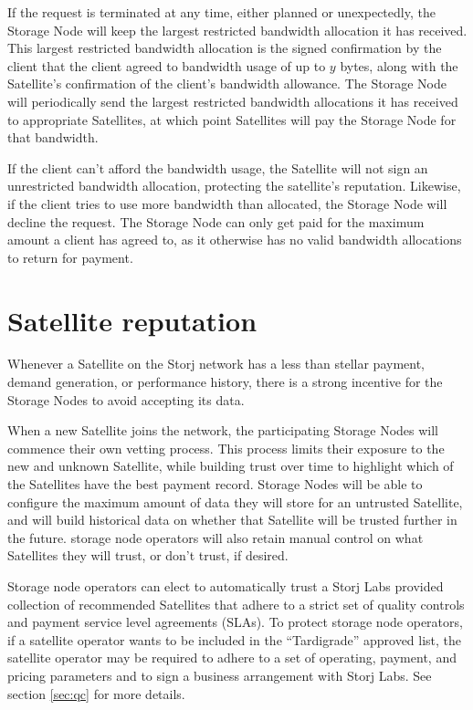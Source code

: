\documentclass[8pt,fleqn,openany]{book}
\begin{document}
If the request is terminated at any time,
either planned or unexpectedly,
the Storage Node will keep the largest restricted bandwidth allocation it has
received.
This largest restricted bandwidth allocation is the signed confirmation
by the client that the client agreed to bandwidth usage of up to $y$
bytes, along with the Satellite's confirmation of the client's bandwidth
allowance.
The Storage Node will periodically send the largest restricted bandwidth
allocations it has received to appropriate Satellites, at which point
Satellites will pay the Storage Node for that bandwidth.

If the client can't afford the bandwidth usage, the Satellite will not sign an
unrestricted bandwidth allocation, protecting the satellite's reputation.
Likewise, if the client tries to use more bandwidth than allocated,
the Storage Node will decline the request.
The Storage Node can only get paid for the maximum amount a client has agreed
to,
as it otherwise has no valid bandwidth allocations to return for
payment.

\section{Satellite reputation}

Whenever a Satellite on the Storj network has a less than stellar payment,
demand generation, or performance history,
there is a strong incentive for the Storage Nodes to avoid accepting its data.

When a new Satellite joins the network, the participating Storage Nodes will
commence their own vetting process.
This process limits their exposure to the new and unknown
Satellite, while building trust over time to highlight which of the
Satellites have the best payment record.
Storage Nodes will be able to configure the maximum amount of data they will
store for an untrusted Satellite, and will build historical data on whether
that Satellite will be trusted further in the future.
storage node operators will also retain manual control on what Satellites they
will trust, or don't trust, if desired.

Storage node operators can elect to automatically trust a Storj Labs
provided collection of recommended Satellites that adhere to a strict set of
quality controls and payment service level agreements (SLAs).
To protect storage node operators, if a satellite operator wants to be
included in the ``Tardigrade'' approved list,
the satellite operator may be required to
adhere to a set of operating, payment, and pricing parameters and to sign a
business arrangement with Storj Labs.
See section \ref{sec:qc} for more details.
\end{document}

